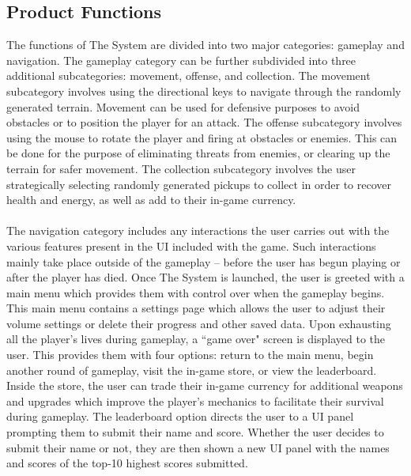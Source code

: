 \documentclass[12pt]{report}
\begin{document}
	\subsection{Product Functions}
		The functions of The System are divided into two major categories: gameplay and navigation. The gameplay category can be further subdivided into three additional subcategories: movement, offense, and collection. The movement subcategory involves using the directional keys to navigate through the randomly generated terrain. Movement can be used for defensive purposes to avoid obstacles or to position the player for an attack. The offense subcategory involves using the mouse to rotate the player and firing at obstacles or enemies. This can be done for the purpose of eliminating threats from enemies, or clearing up the terrain for safer movement. The collection subcategory involves the user strategically selecting randomly generated pickups to collect in order to recover health and energy, as well as add to their in-game currency.
\\ \\
The navigation category includes any interactions the user carries out with the various features present in the UI included with the game. Such interactions mainly take place outside of the gameplay -- before the user has begun playing or after the player has died. Once The System is launched, the user is greeted with a main menu which provides them with control over when the gameplay begins. This main menu contains a settings page which allows the user to adjust their volume settings or delete their progress and other saved data. Upon exhausting all the player's lives during gameplay, a ``game over" screen is displayed to the user. This provides them with four options: return to the main menu, begin another round of gameplay, visit the in-game store, or view the leaderboard. Inside the store, the user can trade their in-game currency for additional weapons and upgrades which improve the player's mechanics to facilitate their survival during gameplay. The leaderboard option directs the user to a UI panel prompting them to submit their name and score. Whether the user decides to submit their name or not, they are then shown a new UI panel with the names and scores of the top-10 highest scores submitted.
\end{document}
